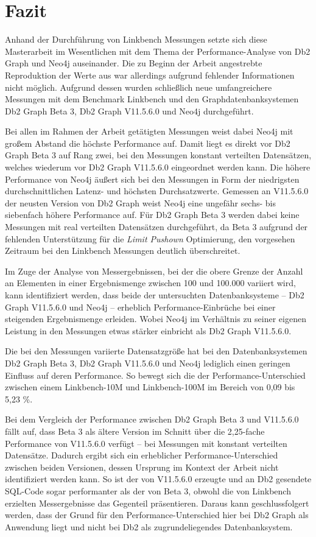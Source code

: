 \chapter{Fazit}
\label{fazit}
Anhand der Durchführung von Linkbench Messungen setzte sich diese Masterarbeit im Wesentlichen mit dem Thema der Performance-Analyse von Db2 Graph und Neo4j auseinander. Die zu Beginn der Arbeit angestrebte Reproduktion der Werte aus \cite{sigmod_tian} war allerdings aufgrund fehlender Informationen nicht möglich. Aufgrund dessen wurden schließlich neue umfangreichere Messungen mit dem Benchmark Linkbench und den Graphdatenbanksystemen Db2 Graph Beta 3, Db2 Graph V11.5.6.0 und Neo4j durchgeführt. 

Bei allen im Rahmen der Arbeit getätigten Messungen weist dabei Neo4j mit großem Abstand die höchste Performance auf. Damit liegt es direkt vor Db2 Graph Beta 3 auf Rang zwei, bei den Messungen konstant verteilten Datensätzen, welches wiederum vor Db2 Graph V11.5.6.0 eingeordnet werden kann. Die höhere Performance von Neo4j äußert sich bei den Messungen in Form der niedrigsten durchschnittlichen Latenz- und höchsten Durchsatzwerte. Gemessen an V11.5.6.0 der neusten Version von Db2 Graph weist Neo4j eine ungefähr sechs- bis siebenfach höhere Performance auf. Für Db2 Graph Beta 3 werden dabei keine Messungen mit real verteilten Datensätzen durchgeführt, da Beta 3 aufgrund der fehlenden Unterstützung für die \textit{Limit Pushown} Optimierung, den vorgesehen Zeitraum bei den Linkbench Messungen deutlich überschreitet.

Im Zuge der Analyse von Messergebnissen, bei der die obere Grenze der Anzahl an Elementen in einer Ergebnismenge zwischen 100 und 100.000 variiert wird, kann identifiziert werden, dass beide der untersuchten Datenbanksysteme -- Db2 Graph V11.5.6.0 und Neo4j -- erheblich Performance-Einbrüche bei einer steigenden Ergebnismenge erleiden. Wobei Neo4j im Verhältnis zu seiner eigenen Leistung in den Messungen etwas stärker einbricht als Db2 Graph V11.5.6.0. 

Die bei den Messungen variierte Datensatzgröße hat bei den Datenbanksystemen Db2 Graph Beta 3, Db2 Graph V11.5.6.0 und Neo4j lediglich einen geringen Einfluss auf deren Performance. So bewegt sich die der Performance-Unterschied zwischen einem Linkbench-10M und Linkbench-100M im Bereich von 0,09 bis 5,23 \%.

Bei dem Vergleich der Performance zwischen Db2 Graph Beta 3 und V11.5.6.0 fällt auf, dass Beta 3 als ältere Version im Schnitt über die 2,25-fache Performance von V11.5.6.0 verfügt -- bei Messungen mit konstant verteilten Datensätze. Dadurch ergibt sich ein erheblicher Performance-Unterschied zwischen beiden Versionen, dessen Ursprung im Kontext der Arbeit nicht identifiziert werden kann. So ist der von V11.5.6.0 erzeugte und an Db2 gesendete SQL-Code sogar performanter als der von Beta 3, obwohl die von Linkbench erzielten Messergebnisse das Gegenteil präsentieren. Daraus kann geschlussfolgert werden, dass der Grund für den Performance-Unterschied hier bei Db2 Graph als Anwendung liegt und nicht bei Db2 als zugrundeliegendes Datenbanksystem.

